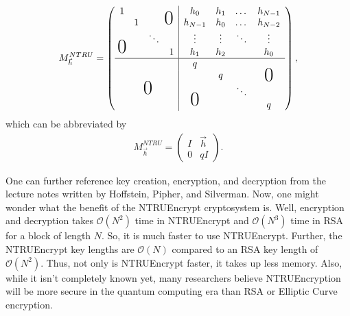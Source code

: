 \documentclass[12pt]{article}
\begin{document}
  \[
    M_{\vec{h}}^{NTRU} = \left(
    \begin{array}{cccc|cccc}
      1 & & & \hspace{-2mm}\raisebox{-1ex}[0ex][0ex]{\makebox(0,0){\text{\huge0}}} & h_0 & h_1 & \dots & h_{N-1}\\ %
      & 1 & & & h_{N-1} & h_0 & \dots & h_{N-2} \\ %
      & & \ddots & & \vdots & \vdots & \ddots & \vdots \\ %
      \raisebox{2ex}[0ex][0ex]{\makebox(0,0){\text{\huge0}}} & & & 1 & h_1 & h_2 & & h_0 \\ %
      \hline
      & & & & q & & & \raisebox{-2ex}[0ex][0ex]{\makebox(0,0){\text{\huge0}}} \\ %
      & & & & & q & & \\ %
      & &\hspace{-4.5mm}\raisebox{2ex}[0ex][0ex]{\makebox(5,0){\text{\huge0}}} & & & & \ddots & \\ %
      & & & & \raisebox{2ex}[0ex][0ex]{\makebox(0,0){\text{\huge0}}} & & & q
    \end{array}
    \right),
  \]
which can be abbreviated by \begin{align*}
    M_{\vec{h}}^{NTRU} = \begin{pmatrix}
    I & \vec{h} \\
    0 & qI
    \end{pmatrix}.
\end{align*}

One can further reference key creation, encryption, and decryption from the lecture notes written by Hoffstein, Pipher, and Silverman. \cite{hoffstein1998ntru} Now, one might wonder what the benefit of the NTRUEncrypt cryptosystem is. Well, encryption and decryption takes $\mathcal{O}(N^2)$ time in NTRUEncrypt and $\mathcal{O}(N^3)$ time in RSA for a block of length $N$. So, it is much faster to use NTRUEncrypt. Further, the NTRUEncrypt key lengths are $\mathcal{O}(N)$ compared to an RSA key length of $\mathcal{O}(N^2)$. Thus, not only is NTRUEncrypt faster, it takes up less memory. Also, while it isn't completely known yet, many researchers believe NTRUEncryption will be more secure in the quantum computing era than RSA or Elliptic Curve encryption.
\newpage
\medskip




\end{document}
